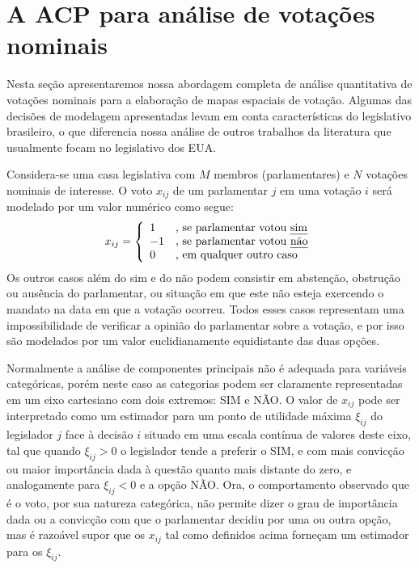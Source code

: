 \documentclass[a4paper, 12pt]{article}
\begin{document}
\section{A ACP para análise de votações nominais}
\label{sec:acp}

Nesta seção apresentaremos nossa abordagem completa de análise quantitativa de votações nominais para a elaboração de mapas espaciais de votação. Algumas das decisões de modelagem apresentadas levam em conta características do legislativo brasileiro, o que diferencia nossa análise de outros trabalhos da literatura que usualmente focam no legislativo dos EUA.

Considera-se uma casa legislativa com $M$ membros (parlamentares) e $N$ votações nominais de interesse. O voto $x_{ij}$ de um parlamentar $j$ em uma votação $i$ será modelado por um valor numérico como segue:
\[
   x_{ij} = \left\{ 
     \begin{array}{l l}
        1 & \text{, se parlamentar votou \emph{sim}} \\
       -1 & \text{, se parlamentar votou \emph{não}} \\
        0 & \text{, em qualquer outro caso} 
     \end{array} \right.
\]
Os outros casos além do sim e do não podem consistir em abstenção, obstrução ou ausência do parlamentar, ou situação em que este não esteja exercendo o mandato na data em que a votação ocorreu. Todos esses casos representam uma impossibilidade de verificar a opinião do parlamentar sobre a votação, e por isso são modelados por um valor euclidianamente equidistante das duas opções.

Normalmente a análise de componentes principais não é adequada para variáveis categóricas, porém neste caso as categorias podem ser claramente representadas em um eixo cartesiano com dois extremos: SIM e NÃO. O valor de $x_{ij}$ pode ser interpretado como um estimador para um ponto de utilidade máxima $\xi_{ij}$ do legislador $j$ face à decisão $i$ situado em uma escala contínua de valores deste eixo, tal que quando $\xi_{ij} > 0$ o legislador tende a preferir o SIM, e com mais convicção ou maior importância dada à questão quanto mais distante do zero, e analogamente para $\xi_{ij} < 0$ e a opção NÃO. Ora, o comportamento observado que é o voto, por sua natureza categórica, não permite dizer o grau de importância dada ou a convicção com que o parlamentar decidiu por uma ou outra opção, mas é razoável supor que os $x_{ij}$ tal como definidos acima forneçam um estimador para os $\xi_{ij}$.
\end{document}
